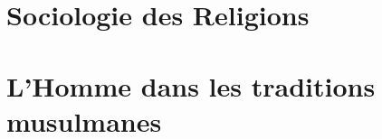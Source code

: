 \documentclass[oneside,10pt]{book}
\begin{document}
 







\setcounter{page}{1}
 



%
%

% 
%
%
%

%
%

% 
 
 
 
 
  
 \part{Sociologie des Religions}
 
 
  
 
 
 
  
  
 


 
  \part{L'Homme dans les traditions musulmanes}
 
 
 
 
 
    
   

   

\end{document}
